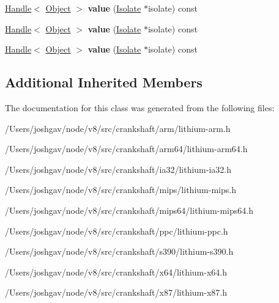 \begin{DoxyCompactItemize}
\item 
\hyperlink{classv8_1_1internal_1_1_handle}{Handle}$<$ \hyperlink{classv8_1_1internal_1_1_object}{Object} $>$ {\bfseries value} (\hyperlink{classv8_1_1internal_1_1_isolate}{Isolate} $\ast$isolate) const \hypertarget{classv8_1_1internal_1_1_l_constant_t_a3959c0353e44c6708ed98ca8967e25d3}{}\label{classv8_1_1internal_1_1_l_constant_t_a3959c0353e44c6708ed98ca8967e25d3}

\item 
\hyperlink{classv8_1_1internal_1_1_handle}{Handle}$<$ \hyperlink{classv8_1_1internal_1_1_object}{Object} $>$ {\bfseries value} (\hyperlink{classv8_1_1internal_1_1_isolate}{Isolate} $\ast$isolate) const \hypertarget{classv8_1_1internal_1_1_l_constant_t_a3959c0353e44c6708ed98ca8967e25d3}{}\label{classv8_1_1internal_1_1_l_constant_t_a3959c0353e44c6708ed98ca8967e25d3}

\item 
\hyperlink{classv8_1_1internal_1_1_handle}{Handle}$<$ \hyperlink{classv8_1_1internal_1_1_object}{Object} $>$ {\bfseries value} (\hyperlink{classv8_1_1internal_1_1_isolate}{Isolate} $\ast$isolate) const \hypertarget{classv8_1_1internal_1_1_l_constant_t_a3959c0353e44c6708ed98ca8967e25d3}{}\label{classv8_1_1internal_1_1_l_constant_t_a3959c0353e44c6708ed98ca8967e25d3}

\end{DoxyCompactItemize}
\subsection*{Additional Inherited Members}


The documentation for this class was generated from the following files\+:\begin{DoxyCompactItemize}
\item 
/\+Users/joshgav/node/v8/src/crankshaft/arm/lithium-\/arm.\+h\item 
/\+Users/joshgav/node/v8/src/crankshaft/arm64/lithium-\/arm64.\+h\item 
/\+Users/joshgav/node/v8/src/crankshaft/ia32/lithium-\/ia32.\+h\item 
/\+Users/joshgav/node/v8/src/crankshaft/mips/lithium-\/mips.\+h\item 
/\+Users/joshgav/node/v8/src/crankshaft/mips64/lithium-\/mips64.\+h\item 
/\+Users/joshgav/node/v8/src/crankshaft/ppc/lithium-\/ppc.\+h\item 
/\+Users/joshgav/node/v8/src/crankshaft/s390/lithium-\/s390.\+h\item 
/\+Users/joshgav/node/v8/src/crankshaft/x64/lithium-\/x64.\+h\item 
/\+Users/joshgav/node/v8/src/crankshaft/x87/lithium-\/x87.\+h\end{DoxyCompactItemize}
